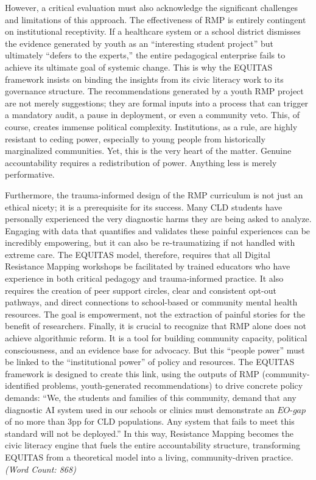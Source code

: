 \documentclass[11pt,twoside]{article}
\DeclareRobustCommand{\EOgap}{EO\text{-}gap\xspace}
\DeclareRobustCommand{\pp}{pp\xspace} %
\begin{document}
However, a critical evaluation must also acknowledge the significant challenges and limitations of this approach. The effectiveness of RMP is entirely contingent on institutional receptivity. If a healthcare system or a school district dismisses the evidence generated by youth as an “interesting student project” but ultimately “defers to the experts,” the entire pedagogical enterprise fails to achieve its ultimate goal of systemic change. This is why the EQUITAS framework insists on binding the insights from its civic literacy work to its governance structure. The recommendations generated by a youth RMP project are not merely suggestions; they are formal inputs into a process that can trigger a mandatory audit, a pause in deployment, or even a community veto. This, of course, creates immense political complexity. Institutions, as a rule, are highly resistant to ceding power, especially to young people from historically marginalized communities. Yet, this is the very heart of the matter. Genuine accountability requires a redistribution of power. Anything less is merely performative.

Furthermore, the trauma-informed design of the RMP curriculum is not just an ethical nicety; it is a prerequisite for its success. Many CLD students have personally experienced the very diagnostic harms they are being asked to analyze. Engaging with data that quantifies and validates these painful experiences can be incredibly empowering, but it can also be re-traumatizing if not handled with extreme care. The EQUITAS model, therefore, requires that all Digital Resistance Mapping workshops be facilitated by trained educators who have experience in both critical pedagogy and trauma-informed practice. It also requires the creation of peer support circles, clear and consistent opt-out pathways, and direct connections to school-based or community mental health resources. The goal is empowerment, not the extraction of painful stories for the benefit of researchers. Finally, it is crucial to recognize that RMP alone does not achieve algorithmic reform. It is a tool for building community capacity, political consciousness, and an evidence base for advocacy. But this “people power” must be linked to the “institutional power” of policy and resources. The EQUITAS framework is designed to create this link, using the outputs of RMP (community-identified problems, youth-generated recommendations) to drive concrete policy demands: “We, the students and families of this community, demand that any diagnostic AI system used in our schools or clinics must demonstrate an $\EOgap$ of no more than 3\pp for CLD populations. Any system that fails to meet this standard will not be deployed.” In this way, Resistance Mapping becomes the civic literacy engine that fuels the entire accountability structure, transforming EQUITAS from a theoretical model into a living, community-driven practice. \textit{(Word Count: 868)}
\end{document}
